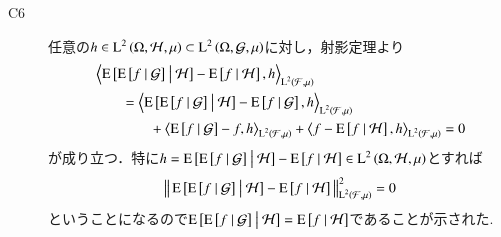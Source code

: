 \begin{prf}
\begin{description}
			\item[C6] 任意の$h \in \operatorname{L}^{2} \left(\Omega, \mathcal{H},\mu\right) \subset \operatorname{L}^{2} \left(\Omega, \mathcal{G},\mu\right)$に対し，射影定理より
				\begin{align}
					&\inprod<\cexp{\cexp{f}{\mathcal{G}}}{\mathcal{H}} - \cexp{f}{\mathcal{H}}, h>_{\Lp{2}{\mathcal{F},\mu}} \\
					&\qquad = \inprod<\cexp{\cexp{f}{\mathcal{G}}}{\mathcal{H}} - \cexp{f}{\mathcal{G}}, h>_{\Lp{2}{\mathcal{F},\mu}} \\
						&\qquad \qquad + \inprod<\cexp{f}{\mathcal{G}} - f, h>_{\Lp{2}{\mathcal{F},\mu}} + \inprod<f - \cexp{f}{\mathcal{H}}, h>_{\Lp{2}{\mathcal{F},\mu}}
					= 0
				\end{align}
				が成り立つ．特に$h = \operatorname{E} \left[ \operatorname{E} \left[ f \ \middle|\ \mathcal{G} \right] \ \middle|\ \mathcal{H} \right] - \operatorname{E} \left[ f \ \middle|\ \mathcal{H} \right] \in \operatorname{L}^{2} \left(\Omega, \mathcal{H},\mu\right)$とすれば
				\begin{align}
					\left\|\, \operatorname{E} \left[ \operatorname{E} \left[ f \ \middle|\ \mathcal{G} \right] \ \middle|\ \mathcal{H} \right] - \operatorname{E} \left[ f \ \middle|\ \mathcal{H} \right]\, \right\|_{\operatorname{L}^{2} \left(\mathcal{F},\mu\right)}^2 = 0
				\end{align}
				ということになるので$\operatorname{E} \left[ \operatorname{E} \left[ f \ \middle|\ \mathcal{G} \right] \ \middle|\ \mathcal{H} \right] = \operatorname{E} \left[ f \ \middle|\ \mathcal{H} \right]$であることが示された.
		\end{description}
		\QED
	\end{prf}
